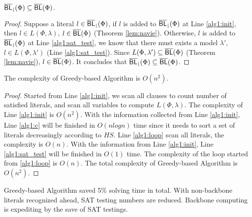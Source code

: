 \begin{theorem}
${\sf \overline{BL}_\downharpoonright}(\Phi)\subseteq\overline{\textsf{BL}}(\Phi)$.
\end{theorem}

\begin{proof}
Suppose a literal $l\in{\sf \overline{BL}_\downharpoonright}(\Phi)$, if $l$ is added to ${\sf \overline{BL}_\downharpoonright}(\Phi)$ at Line \ref{alg1:init}, then $l\in L(\Phi,\lambda)$, $l\in\overline{\textsf{BL}}(\Phi)$ (Theorem \ref{lem:navie}). Otherwise, $l$ is added to ${\sf \overline{BL}_\downharpoonright}(\Phi)$ at Line \ref{alg1:sat_test}, we know that there must exists a model $\lambda'$, $l\in L(\Phi,\lambda')$ (Line \ref{alg1:sat_test}). Since $L(\Phi,\lambda')\subseteq\overline{\textsf{BL}}(\Phi)$ (Theorem \ref{lem:navie}), $l\in\overline{\textsf{BL}}(\Phi)$. It concludes that ${\sf \overline{BL}_\downharpoonright}(\Phi)\subseteq\overline{\textsf{BL}}(\Phi)$.
\end{proof}

\begin{theorem}
The complexity of Greedy-based Algorithm is $O(n^2)$.
\end{theorem}

\begin{proof}
Started from Line \ref{alg1:init}, we scan all clauses to count number of satisfied literals, and scan all variables to compute $L(\Phi,\lambda)$. The complexity of Line \ref{alg1:init} is $O(n^2)$. With the information collected from Line \ref{alg1:init}, Line \ref{alg1:c} will be finished in $O(nlogn)$ time since it needs to sort a set of literals decreasingly according to $HS$.  Line \ref{alg1:loop} scan all literals, the complexity is $O(n)$. With the information from Line \ref{alg1:init}, Line \ref{alg1:sat_test} will be finished in $O(1)$ time. The complexity of the loop started from \ref{alg1:loop} is $O(n)$. The total complexity of Greedy-based Algorithm is $O(n^2)$.
\end{proof}

Greedy-based Algorithm saved 5\% solving time in total. With non-backbone literals recognized ahead, SAT testing numbers are reduced. Backbone computing is expediting by the save of SAT testings.
